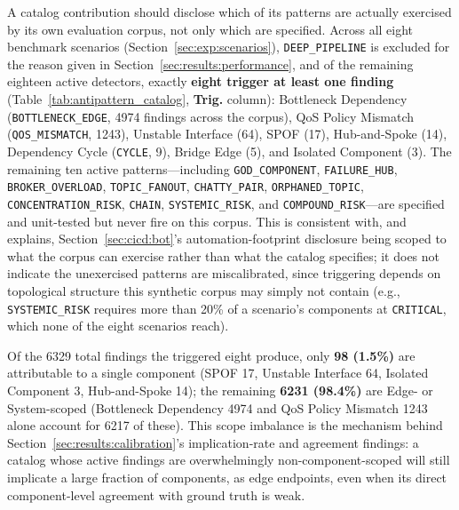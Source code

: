 A catalog contribution should disclose which of its patterns are actually exercised by its own evaluation corpus, not only which are specified. Across all eight benchmark scenarios (Section~\ref{sec:exp:scenarios}), \texttt{DEEP\_PIPELINE} is excluded for the reason given in Section~\ref{sec:results:performance}, and of the remaining eighteen active detectors, exactly \textbf{eight trigger at least one finding} (Table~\ref{tab:antipattern_catalog}, \textbf{Trig.} column): Bottleneck Dependency (\texttt{BOTTLENECK\_EDGE}, 4974 findings across the corpus), QoS Policy Mismatch (\texttt{QOS\_MISMATCH}, 1243), Unstable Interface (64), SPOF (17), Hub-and-Spoke (14), Dependency Cycle (\texttt{CYCLE}, 9), Bridge Edge (5), and Isolated Component (3). The remaining ten active patterns---including \texttt{GOD\_COMPONENT}, \texttt{FAILURE\_HUB}, \texttt{BROKER\_OVERLOAD}, \texttt{TOPIC\_FANOUT}, \texttt{CHATTY\_PAIR}, \texttt{ORPHANED\_TOPIC}, \texttt{CONCENTRATION\_RISK}, \texttt{CHAIN}, \texttt{SYSTEMIC\_RISK}, and \texttt{COMPOUND\_RISK}---are specified and unit-tested but never fire on this corpus. This is consistent with, and explains, Section~\ref{sec:cicd:bot}'s automation-footprint disclosure being scoped to what the corpus can exercise rather than what the catalog specifies; it does not indicate the unexercised patterns are miscalibrated, since triggering depends on topological structure this synthetic corpus may simply not contain (e.g., \texttt{SYSTEMIC\_RISK} requires more than 20\% of a scenario's components at \texttt{CRITICAL}, which none of the eight scenarios reach).

Of the 6329 total findings the triggered eight produce, only \textbf{98 (1.5\%)} are attributable to a single component (SPOF 17, Unstable Interface 64, Isolated Component 3, Hub-and-Spoke 14); the remaining \textbf{6231 (98.4\%)} are Edge- or System-scoped (Bottleneck Dependency 4974 and QoS Policy Mismatch 1243 alone account for 6217 of these). This scope imbalance is the mechanism behind Section~\ref{sec:results:calibration}'s implication-rate and agreement findings: a catalog whose active findings are overwhelmingly non-component-scoped will still implicate a large fraction of components, as edge endpoints, even when its direct component-level agreement with ground truth is weak.
